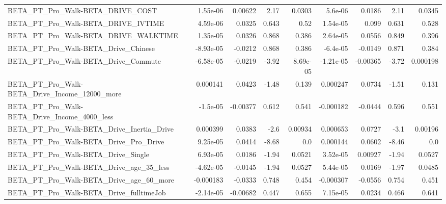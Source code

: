 \begin{tabular}{lrrrrrrrr}
BETA\_PT\_Pro\_Walk-BETA\_DRIVE\_COST                   &    1.55e-06 &      0.00622 &     2.17 &   0.0303 &    5.6e-06 &      0.0186 &         2.11 &        0.0345 \\
BETA\_PT\_Pro\_Walk-BETA\_DRIVE\_IVTIME                 &    4.59e-06 &       0.0325 &    0.643 &     0.52 &   1.54e-05 &       0.099 &        0.631 &         0.528 \\
BETA\_PT\_Pro\_Walk-BETA\_DRIVE\_WALKTIME               &    1.35e-05 &       0.0326 &    0.868 &    0.386 &   2.64e-05 &      0.0556 &        0.849 &         0.396 \\
BETA\_PT\_Pro\_Walk-BETA\_Drive\_Chinese                &   -8.93e-05 &      -0.0212 &    0.868 &    0.386 &   -6.4e-05 &     -0.0149 &        0.871 &         0.384 \\
BETA\_PT\_Pro\_Walk-BETA\_Drive\_Commute                &   -6.58e-05 &      -0.0219 &    -3.92 & 8.69e-05 &  -1.21e-05 &    -0.00365 &        -3.72 &      0.000198 \\
BETA\_PT\_Pro\_Walk-BETA\_Drive\_Income\_12000\_more      &    0.000141 &       0.0423 &    -1.48 &    0.139 &   0.000247 &      0.0734 &        -1.51 &         0.131 \\
BETA\_PT\_Pro\_Walk-BETA\_Drive\_Income\_4000\_less       &    -1.5e-05 &     -0.00377 &    0.612 &    0.541 &  -0.000182 &     -0.0444 &        0.596 &         0.551 \\
BETA\_PT\_Pro\_Walk-BETA\_Drive\_Inertia\_Drive          &    0.000399 &       0.0383 &     -2.6 &  0.00934 &   0.000653 &      0.0727 &         -3.1 &       0.00196 \\
BETA\_PT\_Pro\_Walk-BETA\_Drive\_Pro\_Drive              &    9.25e-05 &       0.0414 &    -8.68 &      0.0 &   0.000144 &      0.0602 &        -8.46 &           0.0 \\
BETA\_PT\_Pro\_Walk-BETA\_Drive\_Single                 &    6.93e-05 &       0.0186 &    -1.94 &   0.0521 &   3.52e-05 &     0.00927 &        -1.94 &        0.0527 \\
BETA\_PT\_Pro\_Walk-BETA\_Drive\_age\_35\_less            &   -4.62e-05 &      -0.0145 &    -1.94 &   0.0527 &   5.44e-05 &      0.0169 &        -1.97 &        0.0485 \\
BETA\_PT\_Pro\_Walk-BETA\_Drive\_age\_60\_more            &   -0.000183 &      -0.0333 &    0.748 &    0.454 &  -0.000307 &     -0.0556 &        0.754 &         0.451 \\
BETA\_PT\_Pro\_Walk-BETA\_Drive\_fulltimeJob            &   -2.14e-05 &     -0.00682 &    0.447 &    0.655 &   7.15e-05 &      0.0234 &        0.466 &         0.641 \\

\end{tabular}
